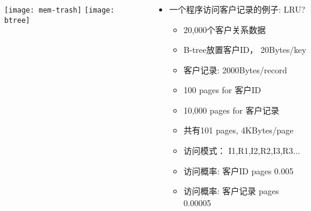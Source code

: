 \begin{frame}[plain]
	\frametitle{ }
	\begin{columns}
		\begin{column}{.5\textwidth}
			\centering
			\texttt{[image: mem-trash]}
			\texttt{[image: btree]}
		\end{column}
		
		\begin{column}{.5\textwidth}
			
			\begin{itemize}
				\item 一个程序访问客户记录的例子: LRU?
				\begin{itemize}
					
					\item 20,000个客户关系数据
					\item B-tree放置客户ID， 20Bytes/key
					\item 客户记录: 2000Bytes/record
					\item 100 pages for 客户ID
					\item 10,000 pages for 客户记录
					\item 共有101 pages, 4KBytes/page
					\item 访问模式： I1,R1,I2,R2,I3,R3...
					\item 访问概率: 客户ID pages 0.005
					\item 访问概率: 客户记录 pages 0.00005
				\end{itemize}
			\end{itemize}


		\end{column}
		
		
	\end{columns}
\end{frame}



